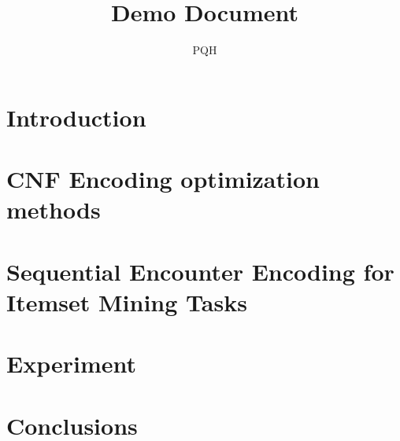 \documentclass[14pt,a4paper]{report}
\title{Demo Document}
\author{PQH}
\begin{document}









\fontsize{13}{15}\selectfont

\chapter{Introduction}




\chapter{CNF Encoding optimization methods}



\chapter{Sequential Encounter Encoding for Itemset Mining Tasks}




\chapter{Experiment}




\chapter*{Conclusions}






\end{document}
